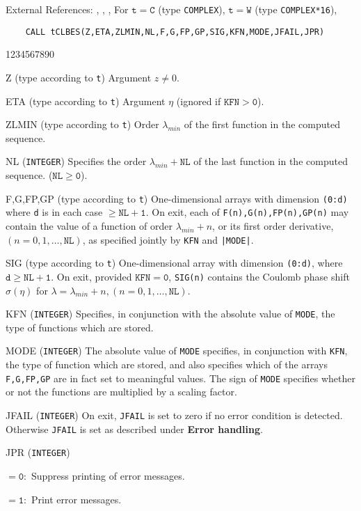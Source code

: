 External References: , ,
, 
\Usage
For $\mathtt{t=C}$ (type {\tt COMPLEX}), $\mathtt{t=W}$ (type
{\tt COMPLEX*16}),
\begin{verbatim}
    CALL tCLBES(Z,ETA,ZLMIN,NL,F,G,FP,GP,SIG,KFN,MODE,JFAIL,JPR)
\end{verbatim}
\begin{DLtt}{1234567890}
\item[Z] (type according to {\tt t}) Argument $ z \ne 0$.
\item [ETA] (type according to {\tt t}) Argument $\eta$
(ignored if $\mathtt{KFN > 0}$).
\item [ZLMIN] (type according to {\tt t})
Order $\lambda_{min}$ of the first function in the computed sequence.
\item[NL] ({\tt INTEGER})
Specifies the order $\lambda_{min}+\mathtt{NL}$ of the last
function in the computed sequence. ($\mathtt{NL \ge 0}$).
\item [F,G,FP,GP] (type according to {\tt t})
One-dimensional arrays with dimension {\tt (0:d)}
where {\tt d} is in each case $\mathtt{\ge NL+1}$.
On exit, each of {\tt F(n),G(n),FP(n),GP(n)} may contain
the value of a function of order $\lambda_{min}+n$, or its first
order derivative, $(n=0,1,\ldots,\mathtt{NL})$, as specified jointly by
{\tt KFN} and {\tt |MODE|}.
\item[SIG] (type according to {\tt t})
One-dimensional array with dimension {\tt (0:d)},
where  $\mathtt{d \ge NL+1}$. On exit, provided $\mathtt{KFN=0}$,
{\tt SIG(n)} contains the Coulomb phase shift $\sigma(\eta)$ for
$\lambda=\lambda_{min}+n, (n=0,1,\ldots, \mathtt{NL})$.
\item [KFN] ({\tt INTEGER}) Specifies, in conjunction with the absolute
value of {\tt MODE}, the type of functions which are stored.
\item[MODE] ({\tt INTEGER})
The absolute value of {\tt MODE} specifies, in conjunction
with {\tt KFN}, the type of function which are stored, and also specifies
which of the arrays {\tt F,G,FP,GP} are in fact set to meaningful values.
The sign of {\tt MODE} specifies whether or not the functions are
multiplied by a scaling factor.
\item[JFAIL] ({\tt INTEGER})
On exit, {\tt JFAIL} is set to zero if no error condition is
detected. Otherwise {\tt JFAIL} is set as described under
{\bf Error handling}.
\item[JPR] ({\tt INTEGER})
\item[] $\mathtt{= 0:}$ Suppress printing of error messages.
\item[] $\mathtt{= 1:}$ Print error messages.
\end{DLtt}
